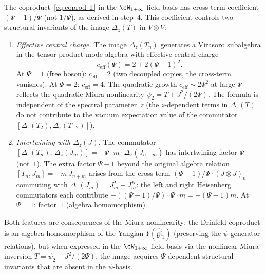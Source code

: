 \begin{remark}
\label{rem:spin2-ceff-miura}
The coproduct~\eqref{eq:coprod-T} in the
$\cW_{1+\infty}$ field basis has cross-term coefficient
$(\Psi - 1)/\Psi$ (not $1/\Psi$), as derived in step~4.
This coefficient controls two structural invariants of the
image $\Delta_z(T)$ in $V \otimes V$:
\begin{enumerate}[label=\textup{(\arabic*)}]
\item \emph{Effective central charge.}
 The image $\Delta_z(T_n)$ generates a Virasoro
 subalgebra in the tensor product mode algebra with
 effective central charge
 \begin{equation}\label{eq:c-eff-spin2}
 c_{\mathrm{eff}}(\Psi) = 2 + 2(\Psi - 1)^2.
 \end{equation}
 At $\Psi = 1$ (free boson): $c_{\mathrm{eff}} = 2$
 (two decoupled copies, the cross-term vanishes).
 At $\Psi = 2$: $c_{\mathrm{eff}} = 4$.
 The quadratic growth $c_{\mathrm{eff}} \sim 2\Psi^2$ at
 large $\Psi$ reflects the quadratic Miura nonlinearity
 $\psi_2 = T + J^2/(2\Psi)$.
 The formula is independent of the spectral parameter~$z$
 (the $z$-dependent terms in $\Delta_z(T)$ do not
 contribute to the vacuum expectation value of the
 commutator $[\Delta_z(T_2), \Delta_z(T_{-2})]$).
\item \emph{Intertwining with $\Delta_z(J)$.}
 The commutator
 $[\Delta_z(T_n),\, \Delta_z(J_m)]
 = -\Psi \cdot m \cdot \Delta_z(J_{n+m})$
 has intertwining factor $\Psi$ (not~$1$).
 The extra factor $\Psi - 1$ beyond the original algebra
 relation $[T_n, J_m] = -m\,J_{n+m}$ arises from the
 cross-term $(\Psi - 1)/\Psi \cdot (J \otimes J)_n$
 commuting with $\Delta_z(J_m) = J_m^L + J_m^R$:
 the left and right Heisenberg commutators each contribute
 $-((\Psi-1)/\Psi) \cdot \Psi \cdot m = -(\Psi - 1)m$.
 At $\Psi = 1$: factor~$1$ (algebra homomorphism).
\end{enumerate}
Both features are consequences of the Miura nonlinearity:
the Drinfeld coproduct is an algebra homomorphism of the
Yangian $Y(\widehat{\mathfrak{gl}}_1)$ (preserving the
$\psi$-generator relations), but when expressed in the
$\cW_{1+\infty}$ field basis via the nonlinear Miura
inversion $T = \psi_2 - J^2/(2\Psi)$, the image acquires
$\Psi$-dependent structural invariants that are absent in
the $\psi$-basis.
\end{remark}

